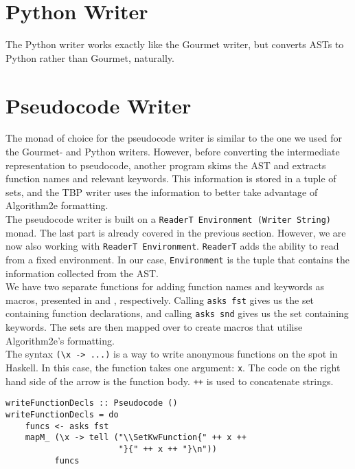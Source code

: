 \section{Python Writer}

The Python writer works exactly like the Gourmet writer, but converts ASTs to Python rather than Gourmet, naturally.

\section{Pseudocode Writer}

The monad of choice for the pseudocode writer is similar to the one we used for the Gourmet- and Python writers. However, before converting the intermediate representation to pseudocode, another program skims the AST and extracts function names and relevant keywords. This information is stored in a tuple of sets, and the TBP writer uses the information to better take advantage of Algorithm2e formatting. \\

The pseudocode writer is built on a \texttt{ReaderT Environment (Writer String)} monad. The last part is already covered in the previous section. However, we are now also working with \texttt{ReaderT Environment}. \texttt{ReaderT} adds the ability to read from a fixed environment. In our case, \texttt{Environment} is the tuple that contains the information collected from the AST. \\

We have two separate functions for adding function names and keywords as macros, presented in  and , respectively. Calling \texttt{asks fst} gives us the set containing function declarations, and calling \texttt{asks snd} gives us the set containing keywords. The sets are then mapped over to create macros that utilise Algorithm2e's formatting. \\

The syntax \texttt{(\textbackslash x -> ...)} is a way to write anonymous functions on the spot in Haskell. In this case, the function takes one argument: \texttt{x}. The code on the right hand side of the arrow is the function body. \texttt{++} is used to concatenate strings. \\

\begin{lstlisting}[caption={Creating LaTeX macros for function declarations.}, captionpos=b, label={writeFD}]
writeFunctionDecls :: Pseudocode ()
writeFunctionDecls = do
    funcs <- asks fst
    mapM_ (\x -> tell ("\\SetKwFunction{" ++ x ++
                       "}{" ++ x ++ "}\n"))
          funcs
\end{lstlisting}

